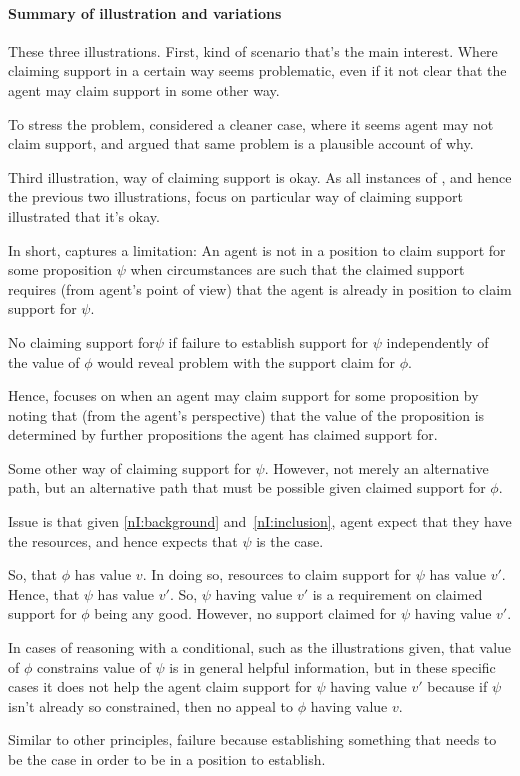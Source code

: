 \paragraph{Summary of illustration and variations}

\begin{note}
  These three illustrations.
  First, kind of scenario that's the main interest.
  Where claiming support in a certain way seems problematic, even if it not clear that the agent may claim support in some other way.

  To stress the problem, considered a cleaner case, where it seems agent may not claim support, and argued that same problem is a plausible account of why.

  Third illustration, way of claiming support is okay.
  As all instances of \nI{}, and hence the previous two illustrations, focus on particular way of claiming support illustrated that it's okay.
\end{note}

\begin{note}[Intuition]
  In short, \nI{} captures a limitation: An agent is not in a position to claim support for some proposition \(\psi\) when circumstances are such that the claimed support requires (from agent's point of view) that the agent is already in position to claim support for \(\psi\).

  No claiming support for\(\psi\) if failure to establish support for \(\psi\) independently of the value of \(\phi\) would reveal problem with the support claim for \(\phi\).

  Hence, \nI{} focuses on when an agent may claim support for some proposition by noting that (from the agent's perspective) that the value of the proposition is determined by further propositions the agent has claimed support for.

  Some other way of claiming support for \(\psi\).
  However, not merely an alternative path, but an alternative path that must be possible given claimed support for \(\phi\).

  Issue is that given \ref{nI:background} and~\ref{nI:inclusion}, agent expect that they have the resources, and hence expects that \(\psi\) is the case.

  So, that \(\phi\) has value \(v\).
  In doing so, resources to claim support for \(\psi\) has value \(v'\).
  Hence, that \(\psi\) has value \(v'\).
  So, \(\psi\) having value \(v'\) is a requirement on claimed support for \(\phi\) being any good.
  However, no support claimed for \(\psi\) having value \(v'\).

  In cases of reasoning with a conditional, such as the illustrations given, that value of \(\phi\) constrains value of \(\psi\) is in general helpful information, but in these specific cases it does not help the agent claim support for \(\psi\) having value \(v'\) because if \(\psi\) isn't already so constrained, then no appeal to \(\phi\) having value \(v\).

  Similar to other principles, failure because establishing something that needs to be the case in order to be in a position to establish.
\end{note}



